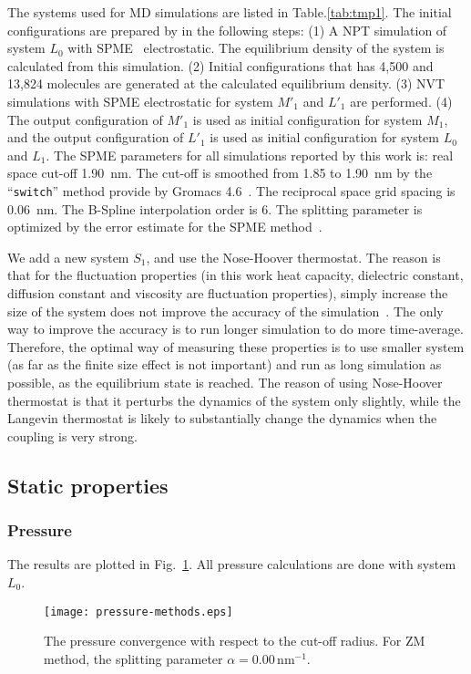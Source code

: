 \documentclass[aip,jcp,a4paper,reprint,unsortedaddress,onecolumn,fleqn]{revtex4-1}
\newcommand{\systemsb}{S_1}
\newcommand{\systemmb}{M_1}
\newcommand{\systemmbp}{M'_1}
\newcommand{\systemla}{L_0}
\newcommand{\systemlbp}{L'_1}
\newcommand{\systemlb}{L_1}
\begin{document}
The systems used for MD simulations are listed in
Table.\ref{tab:tmp1}.  The initial configurations are prepared by in
the following steps: (1) A NPT simulation of system $\systemla$ with SPME~\cite{darden1993pme, essmann1995spm}
electrostatic. The equilibrium density of the system is calculated
from this simulation. (2) Initial configurations that has 4,500 and
13,824 molecules are generated at the calculated equilibrium
density. (3) NVT simulations with SPME electrostatic for system $\systemmbp$
and $\systemlbp$ are performed. (4) The output configuration of $\systemmbp$ is used as
initial configuration for system $\systemmb$, and the output configuration of
$\systemlbp$ is used as initial configuration for system $\systemla$ and $\systemlb$.  The SPME
parameters for all simulations reported by this work is: real space
cut-off 1.90~nm. The cut-off is smoothed from 1.85 to 1.90~nm by the
``\texttt{switch}'' method provide by Gromacs
4.6~\cite{hess2008gromacs, pronk2013gromacs}. The reciprocal space
grid spacing is 0.06~nm. The B-Spline interpolation order is 6. The
splitting parameter is optimized by the error estimate for the SPME method~\cite{wang2010optimizing}.

We add a new system $\systemsb$, and use the Nose-Hoover
thermostat. The reason is that for the fluctuation properties (in this
work heat capacity, dielectric constant, diffusion constant and
viscosity are fluctuation properties), simply increase the size of the
system does not improve the accuracy of the
simulation~\cite{ferrenberg1991statistical}. The only way to improve
the accuracy is to run longer simulation to do more
time-average. Therefore, the optimal way of measuring these properties
is to use smaller system (as far as the finite size effect is not
important) and run as long simulation as possible, as the equilibrium
state is reached. The reason of using Nose-Hoover thermostat is that
it perturbs the dynamics of the system only slightly, while the
Langevin thermostat is likely to substantially change the dynamics
when the coupling is very strong.

\subsection{Static properties}

\subsubsection{Pressure}
The results are plotted in Fig.~\ref{fig:tmp0}. All pressure calculations are done with system $\systemla$.
\begin{figure}
  \centering
  \texttt{[image: pressure-methods.eps]}
  \caption{The pressure convergence with respect to the cut-off radius.
    For ZM method, the splitting parameter $\alpha = 0.00\,\textrm{nm}^{-1}$.
  }
  \label{fig:tmp0}
\end{figure}
\end{document}
